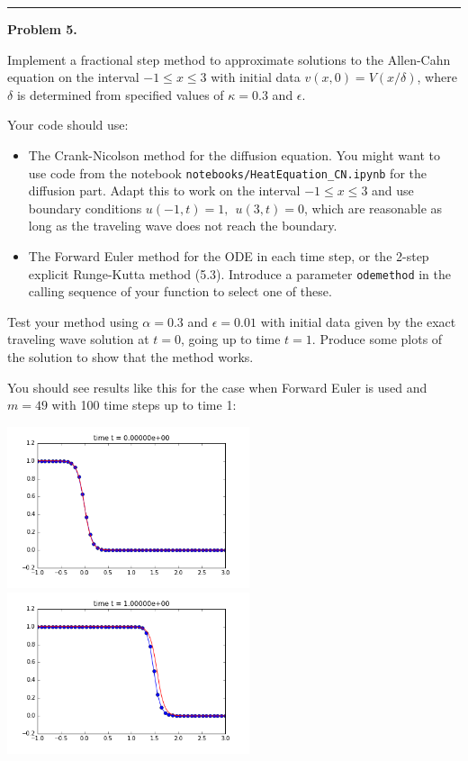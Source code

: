 \documentclass[10pt]{article}
\begin{document}



\vskip 1cm
\hrule
{\bf Problem 5.}  

Implement a fractional step method to approximate solutions to the
Allen-Cahn equation on the interval $-1 \leq x \leq 3$ with initial data
$v(x,0) = V(x/\delta)$, where $\delta$ is determined from specified values
of $\kappa = 0.3$ and $\epsilon$.  

Your code should use: 
\begin{itemize} 
\item The Crank-Nicolson method for the diffusion
equation. 
You might want to use code from the notebook 
\verb+notebooks/HeatEquation_CN.ipynb+
for the diffusion part.  Adapt this to work on the interval $-1 \leq x \leq
3$ and use boundary conditions $u(-1,t) = 1,~~u(3,t)=0$, which are
reasonable as long as the traveling wave does not reach the boundary.
\item The Forward Euler method for the ODE in each time step, or the 2-step
explicit Runge-Kutta method (5.3).  Introduce a parameter \verb+odemethod+
in the calling sequence of your function to select one of these.
\end{itemize} 

Test your method using $\alpha=0.3$ and
$\epsilon = 0.01$ with initial data given by the
exact traveling wave solution at $t=0$, going up to time $t=1$.
Produce some plots of the solution to show that the method works.

You should see results like this for the case when Forward Euler is used and
$m=49$ with 100 time steps up to time 1:


\hfil\includegraphics[width=2.8in]{figs/t0.png}\hfil
\hfil\includegraphics[width=2.8in]{figs/t1.png}\hfil
\end{document}
